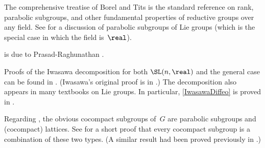 \begin{notes}

The comprehensive treatise of Borel and Tits \cite{BorelTits-GrpRed} is the standard reference on rank, parabolic subgroups, and other fundamental properties of reductive groups over any field.
See \cite[\S7.7, pp.~474--487]{Knapp-BeyondIntro} for a discussion of parabolic subgroups of Lie groups (which is the special case in which the field is~$\real$). 

 is due to Prasad-Raghunathan \cite[Thms.~2.8 and 3.9]{PrasadRaghunathan-Cartan+Latts}.

Proofs of the Iwasawa decomposition for both $\SL(n,\real)$  and the general case  can be found in \cite[Prop.~3.12, p.~129, and Thm.~3.9, p.~131]{PlatonovRapinchukBook}. (Iwasawa's original proof is in \cite[\S3]{Iwasawa-SomeTypes}.) The decomposition also appears in many textbooks on Lie groups. In particular, \cref{IwasawaDiffeo} is proved in \cite[Thm.~6.5.1, pp.~270--271]{HelgasonBook}. 

Regarding , the obvious cocompact subgroups of~$G$ are parabolic subgroups and (cocompact) lattices. See \cite{Witte-cocpct} for a short proof that every cocompact subgroup is a combination of these two types. (A similar result had  been proved previously in \cite[(5.1a)]{GotoWang-NondiscreteUniform}.)

\end{notes}





